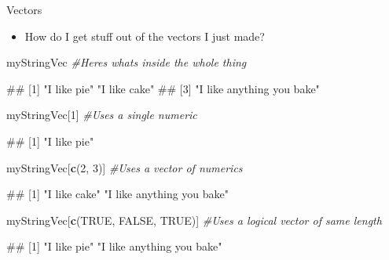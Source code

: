 \documentclass[
  ignorenonframetext,
  aspectratio=169]{beamer}
\newenvironment{Shaded}{\begin{snugshade}}{\end{snugshade}}
\newcommand{\CommentTok}[1]{\textcolor[rgb]{0.56,0.35,0.01}{\textit{#1}}}
\newcommand{\ConstantTok}[1]{\textcolor[rgb]{0.56,0.35,0.01}{#1}}
\newcommand{\DecValTok}[1]{\textcolor[rgb]{0.00,0.00,0.81}{#1}}
\newcommand{\FunctionTok}[1]{\textcolor[rgb]{0.13,0.29,0.53}{\textbf{#1}}}
\newcommand{\NormalTok}[1]{#1}
\providecommand{\tightlist}{%
  \setlength{\itemsep}{0pt}\setlength{\parskip}{0pt}}
\let\oldShaded\Shaded %
\let\endoldShaded\endShaded
\renewenvironment{Shaded}{\footnotesize\oldShaded}{\endoldShaded}
\let\oldverbatim\verbatim %Change fontsize of code chunk output
\let\endoldverbatim\endverbatim
\renewenvironment{verbatim}{\footnotesize\oldverbatim}{\endoldverbatim}
\begin{document}
\begin{frame}[fragile]{Vectors}
\protect\hypertarget{vectors}{}
\begin{itemize}[<+->]
\tightlist
\item
  How do I get stuff out of the vectors I just made?
\end{itemize}

\begin{Shaded}
\begin{Highlighting}[]
\NormalTok{myStringVec  }\CommentTok{\#Here\textquotesingle{}s what\textquotesingle{}s inside the whole thing}
\end{Highlighting}
\end{Shaded}

\begin{verbatim}
## [1] "I like pie"               "I like cake"             
## [3] "I like anything you bake"
\end{verbatim}

\begin{Shaded}
\begin{Highlighting}[]
\NormalTok{myStringVec[}\DecValTok{1}\NormalTok{]  }\CommentTok{\#Uses a single numeric}
\end{Highlighting}
\end{Shaded}

\begin{verbatim}
## [1] "I like pie"
\end{verbatim}

\begin{Shaded}
\begin{Highlighting}[]
\NormalTok{myStringVec[}\FunctionTok{c}\NormalTok{(}\DecValTok{2}\NormalTok{, }\DecValTok{3}\NormalTok{)]  }\CommentTok{\#Uses a vector of numerics}
\end{Highlighting}
\end{Shaded}

\begin{verbatim}
## [1] "I like cake"              "I like anything you bake"
\end{verbatim}

\begin{Shaded}
\begin{Highlighting}[]
\NormalTok{myStringVec[}\FunctionTok{c}\NormalTok{(}\ConstantTok{TRUE}\NormalTok{, }\ConstantTok{FALSE}\NormalTok{, }\ConstantTok{TRUE}\NormalTok{)]  }\CommentTok{\#Uses a logical vector of same length}
\end{Highlighting}
\end{Shaded}

\begin{verbatim}
## [1] "I like pie"               "I like anything you bake"
\end{verbatim}
\end{frame}
\end{document}
